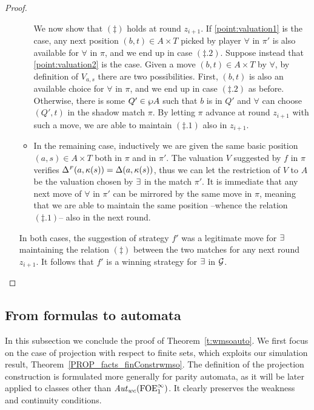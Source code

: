\begin{proof}
\begin{enumerate}[(1)]
\begin{itemize}
We now show that $(\ddag)$ holds at round $z_{i+1}$. 
If \eqref{point:valuation1} is the case, any next position $(b,t)\in A \times T$
picked by player $\forall$ in $\pi'$ is also available for $\forall$ in $\pi$, 
and we end up in case $(\ddag .2)$. 
Suppose instead that \eqref{point:valuation2} is the case. 
Given a move $(b,t) \in A \times T$ by $\forall$, by definition of $V_{a,s}$ 
there are two possibilities. 
First, $(b,t)$ is also an available choice for $\forall$ in $\pi$, and we end up
in case $(\ddag .2)$ as before. 
Otherwise, there is some $Q' \in \wp A$ such that $b$ is in $Q'$ and $\forall$ 
can choose $(Q',t)$ in the shadow match $\pi$. By letting $\pi$ advance at round
$z_{i+1}$ with such a move, we are able to maintain $(\ddag .1)$ also in
$z_{i+1}$.
\item 
In the remaining case, inductively we are given the same basic position $(a,s)
\in A\times T$ both in $\pi$ and in $\pi'$. 
The valuation $V$ suggested by $f$ in $\pi$ verifies $\Delta^{{\scriptscriptstyle F}}(a,\kappa(s)) = 
\Delta(a,\kappa(s))$, thus we can let the restriction of $V$ to $A$ be the valuation
chosen by $\exists$ in the match $\pi'$. 
It is immediate that any next move of $\forall$ in $\pi'$ can be mirrored by the
same move in $\pi$, meaning that we are able to maintain the same position 
--whence the relation $(\ddag.1)$-- also in the next round.
\end{itemize}
In both cases, the suggestion of strategy $f'$ was a legitimate move for 
$\exists$ maintaining the relation $(\ddag)$ between the two matches for any
next round $z_{i+1}$.
It follows that $f'$ is a winning strategy for $\exists$ in $\mathcal{G}$.
\end{enumerate}
\end{proof}





\subsection{From formulas to automata}

In this subsection we conclude the proof of Theorem~\ref{t:wmsoauto}.
We first focus on the case of projection with respect to finite sets, which
exploits our simulation result, Theorem~\ref{PROP_facts_finConstrwmso}.
The definition of the projection construction is formulated more generally for
parity automata, as it will be later applied to classes other than
$\mathit{Aut}_{wc}(\mathrm{FOE}^{\infty}_1)$.
It clearly preserves the weakness and continuity conditions.

